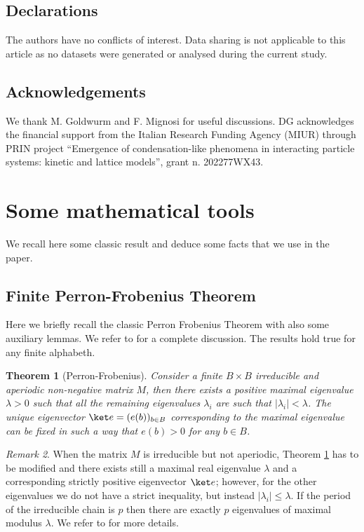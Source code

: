 \documentclass[reqno]{amsart}
\theoremstyle{plain}
\newtheorem{theorem}{Theorem}[section]
\theoremstyle{definition}
\theoremstyle{remark}
\newtheorem{remark}[theorem]{Remark}
\numberwithin{equation}{section}
\numberwithin{theorem}{section}
\newcommand{\<}{\langle}
\renewcommand{\>}{\rangle}
\begin{document}
	\subsection*{Declarations}
	The authors have no conflicts of interest. Data sharing is not applicable to this article as no datasets were generated or analysed during the current study.
	
		\subsection*{Acknowledgements}
	We thank M. Goldwurm and F. Mignosi for useful discussions.
	DG acknowledges the financial support from the Italian Research Funding Agency (MIUR) through
	PRIN project ``Emergence of condensation-like phenomena in interacting particle systems: kinetic and lattice models'', grant n. 202277WX43.
	
	
	\appendix
	
	\section{Some mathematical tools}
	
	
	
	We recall here some classic result and deduce some facts that we use in the paper. 
	
	\subsection{Finite Perron-Frobenius Theorem}
	\label{PF-finite}
	Here we briefly recall the classic Perron Frobenius Theorem with also some auxiliary lemmas. We refer to \cite{K} for a complete discussion. The results hold true for any finite alphabeth.
	
	
	
	\begin{theorem}[Perron-Frobenius]\label{thPFf}
		Consider a finite $B\times B$ irreducible and aperiodic non-negative matrix $M$, then there exists a positive maximal eigenvalue $\lambda>0$ such that all the remaining eigenvalues $\lambda_i$ are such that $|\lambda_i|<\lambda$. The unique eigenvector $\ket e=(e(b))_{b\in B}$ corresponding to the maximal eigenvalue can be fixed in such a way that $e(b)>0$ for any $b\in B$.
	\end{theorem}
	
	
	\begin{remark}
		When the matrix $M$ is irreducible but not aperiodic, Theorem \ref{thPFf} has to be modified and there exists still a maximal real eigenvalue $\lambda$ and a corresponding strictly positive eigenvector $\ket e$; however, for the other eigenvalues we do not have a strict inequality, but instead $|\lambda_i|\leq\lambda$. If the period of the irreducible chain is $p$ then there are exactly $p$ eigenvalues of maximal modulus $\lambda$. We refer to \cite{K} for more details.
	\end{remark}
	
\end{document}
